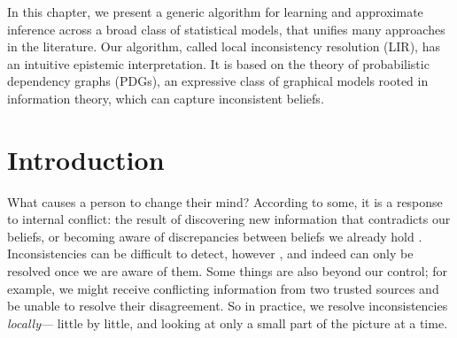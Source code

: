     \label{chap:LIR}

In this chapter, 
we present a generic algorithm
    for learning and
    approximate inference
    across a broad class of statistical models,
    that unifies many approaches in the literature.
Our algorithm,
    called local inconsistency resolution (LIR),
    has an intuitive epistemic interpretation.
It is based on the theory of
    probabilistic dependency graphs (PDGs),
    an expressive class of graphical models
        rooted in information theory,
        which can capture inconsistent beliefs.

\section{Introduction}
What causes a person to change their mind?
According to some,
    it is a response to internal conflict:
    the result of
    discovering new information that contradicts our beliefs, or
    becoming aware of discrepancies between beliefs we already hold
    \citep{festinger1962cognitive}.
Inconsistencies
    can be difficult to detect, however
    \citep{selman1996generating}, and indeed can only
    be resolved once we are aware of them.
Some things are also
 beyond our control;
    for example, we might receive conflicting information
        from two trusted sources and be unable to resolve
        their disagreement.
So in practice, we resolve inconsistencies \emph{locally}---%
    little by little, and looking at
        only a small part of the picture at a time.

